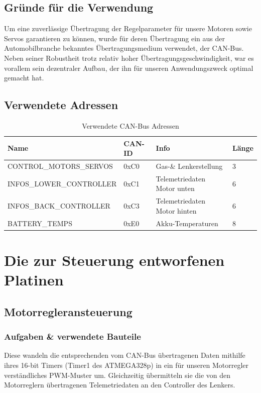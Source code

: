 \subsection{Gründe für die Verwendung}
Um eine zuverlässige Übertragung der Regelparameter für unsere Motoren sowie Servos garantieren zu können, wurde für deren Übertragung ein aus der Automobilbranche bekanntes Übertragungsmedium verwendet, der CAN-Bus. 
Neben seiner Robustheit trotz relativ hoher Übertragungsgeschwindigkeit, war es vorallem sein dezentraler Aufbau, der ihn für unseren Anwendungszweck optimal gemacht hat.

\newpage

\subsection{Verwendete Adressen}
\begin{table}[h]
    \begin{tabular}{|l|l|l|l|}
        \hline
    Name                              & CAN-ID & Info         & Länge \\\hline
    CONTROL\_MOTORS\_SERVOS  & 0xC0   & Gas-\& Lenkerstellung & 3     \\
    INFOS\_LOWER\_CONTROLLER & 0xC1   & Telemetriedaten Motor unten  & 6     \\
    INFOS\_BACK\_CONTROLLER  & 0xC3   & Telemetriedaten Motor hinten & 6     \\
    BATTERY\_TEMPS           & 0xE0   & Akku-Temperaturen            & 8    \\\hline
    \end{tabular}
    \caption{Verwendete CAN-Bus Adressen}
\end{table}

\section{Die zur Steuerung entworfenen Platinen}
\subsection{Motorregleransteuerung}
\subsubsection{Aufgaben \& verwendete Bauteile}
Diese wandeln die entsprechenden vom CAN-Bus übertragenen Daten mithilfe ihres 16-bit Timers (Timer1 des ATMEGA328p) in ein für unseren Motorregler verständliches PWM-Muster um.
Gleichzeitig übermitteln sie die von den Motorreglern übertragenen Telemetriedaten an den Controller des Lenkers.


